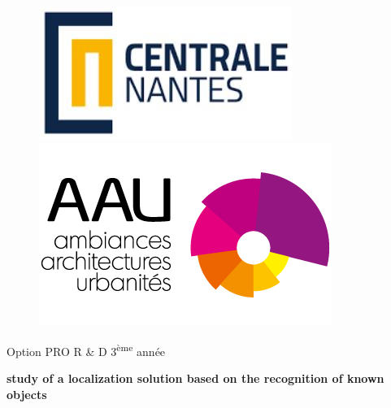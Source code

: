 \documentclass[10pt]{article}
\begin{document}
    \begin{titlepage}
        \begin{figure}%
            \begin{minipage}[c]{0.40\linewidth}%
                \includegraphics[width=\textwidth]{ECN.JPG}
            \end{minipage}
            \hspace{4cm}
            \begin{minipage}[c]{0.30\linewidth}%
                \includegraphics[width=\textwidth]{logo-aau.png}
            \end{minipage}
            \vspace{2cm}
        \end{figure}%
        \centering
        {\Large Option PRO R \& D 3\textsuperscript{ème} année \par}
        \vspace{1cm}
        {\huge\bfseries study of a localization solution based on the recognition of known objects \par}
        \vspace{1.5cm}

\end{titlepage}
\end{document}
